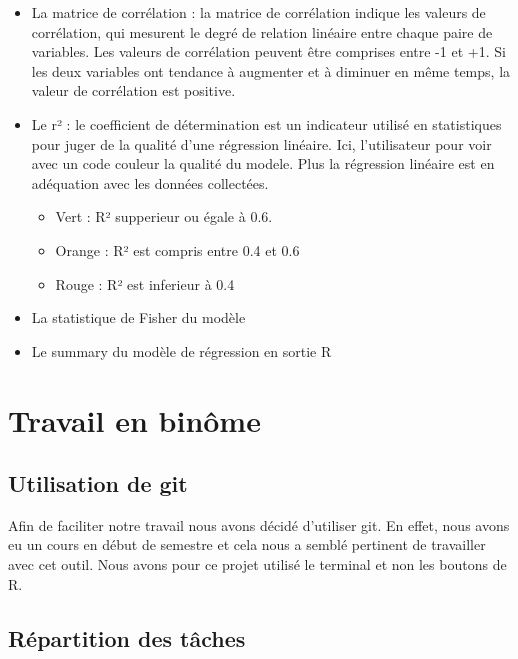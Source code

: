\documentclass[
]{article}
\providecommand{\tightlist}{%
  \setlength{\itemsep}{0pt}\setlength{\parskip}{0pt}}
\begin{document}
\begin{itemize}
\item
  La matrice de corrélation : la matrice de corrélation indique les
  valeurs de corrélation, qui mesurent le degré de relation linéaire
  entre chaque paire de variables. Les valeurs de corrélation peuvent
  être comprises entre -1 et +1. Si les deux variables ont tendance à
  augmenter et à diminuer en même temps, la valeur de corrélation est
  positive.
\item
  Le r² : le coefficient de détermination est un indicateur utilisé en
  statistiques pour juger de la qualité d'une régression linéaire. Ici,
  l'utilisateur pour voir avec un code couleur la qualité du modele.
  Plus la régression linéaire est en adéquation avec les données
  collectées.

  \begin{itemize}
  \tightlist
  \item
    Vert : R² supperieur ou égale à 0.6.
  \item
    Orange : R² est compris entre 0.4 et 0.6\\
  \item
    Rouge : R² est inferieur à 0.4
  \end{itemize}
\item
  La statistique de Fisher du modèle
\item
  Le summary du modèle de régression en sortie R
\end{itemize}

\hypertarget{travail-en-binuxf4me}{%
\section{Travail en binôme}\label{travail-en-binuxf4me}}

\hypertarget{utilisation-de-git}{%
\subsection{Utilisation de git}\label{utilisation-de-git}}

Afin de faciliter notre travail nous avons décidé d'utiliser git. En
effet, nous avons eu un cours en début de semestre et cela nous a semblé
pertinent de travailler avec cet outil. Nous avons pour ce projet
utilisé le terminal et non les boutons de R.

\hypertarget{ruxe9partition-des-tuxe2ches}{%
\subsection{Répartition des tâches}\label{ruxe9partition-des-tuxe2ches}}
\end{document}
